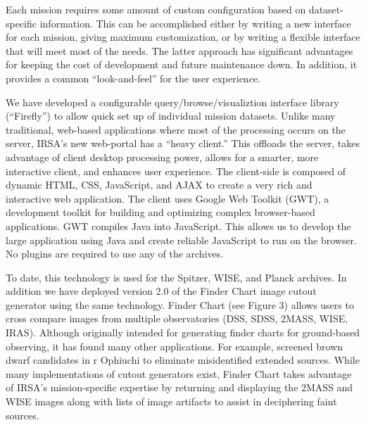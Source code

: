 Each mission requires some amount of custom configuration based on dataset-specific information.  This can be accomplished either by writing a new interface for each mission, giving maximum customization, or by writing a flexible interface that will meet most of the needs.  The latter approach has significant advantages for keeping the cost of development and future maintenance down.  In addition, it provides a common ``look-and-feel'' for the user experience.

We have developed a configurable query/browse/visualiztion interface library (``Firefly'') to allow quick set up of individual mission datasets.  Unlike many traditional, web-based applications where most of the processing occurs on the server, IRSA’s new web-portal has a “heavy client.” This offloads the server, takes advantage of client desktop processing power, allows for a smarter, more interactive client, and enhances user experience. The client-side is composed of dynamic HTML, CSS, JavaScript, and AJAX to create a very rich and interactive web application. The client uses Google Web Toolkit (GWT), a development toolkit for building and optimizing complex browser-based applications. GWT compiles Java into JavaScript. This allows us to develop the large application using Java and create reliable JavaScript to run on the browser. No plugins are required to use any of the archives.  

To date, this technology is used for the Spitzer, WISE, and Planck archives. In addition we have deployed version 2.0 of the Finder Chart image cutout generator using the same technology.  Finder Chart (see Figure 3) allows users to cross compare images from multiple observatories (DSS, SDSS, 2MASS, WISE, IRAS). Although originally intended for generating finder charts for ground-based observing, it has found many other applications. For example, \citet{mathews07} screened brown dwarf candidates in r Ophiuchi to eliminate misidentified extended sources. While many implementations of cutout generators exist, Finder Chart takes advantage of IRSA’s mission-specific expertise by returning and displaying the 2MASS and WISE images along with lists of image artifacts to assist in deciphering faint sources.

